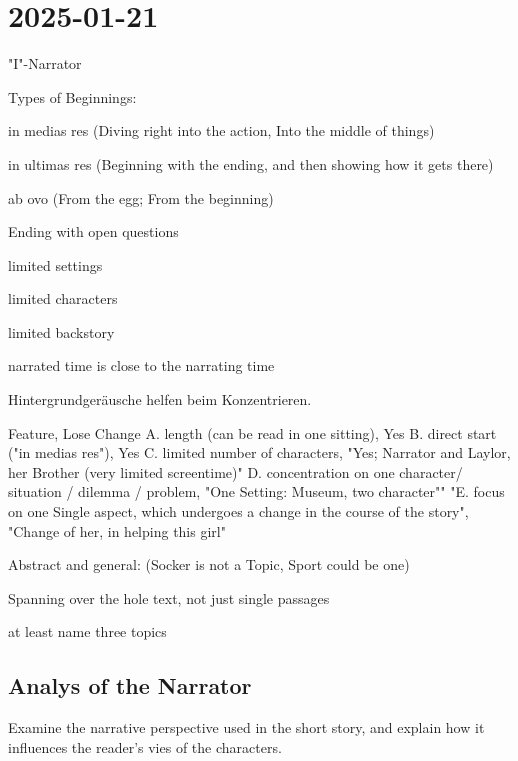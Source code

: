 \section{2025-01-21}

\startitemize[packed]
\item "I"-Narrator
\stopitemize

\startitemize[packed]
\item Types of Beginnings:
\startitemize[packed]
\item in medias res (Diving right into the action, Into the middle of things)
\item in ultimas res (Beginning with the ending, and then showing how it gets there)
\item ab ovo (From the egg; From the beginning)
\stopitemize
\item Ending with open questions
\item limited settings
\item limited characters
\item limited backstory
\item narrated time is close to the narrating time
\stopitemize

\startframedtipp
Hintergrundgeräusche helfen beim Konzentrieren.
\stopframedtipp

\startplacetable[location={here},title={analysis}]
\setupTABLE[r][1][background=color,backgroundcolor=gray]
\bTABLE[offset=1mm]
\startCSV
Feature, Lose Change
A. length (can be read in one sitting), Yes
B. direct start ("in medias res"), Yes
C. limited number of characters, "Yes; Narrator and Laylor, her Brother (very limited screentime)"
D. concentration on one character/ situation / dilemma / problem, "One Setting: Museum, two character""
"E. focus on one Single aspect, which undergoes a change in the course of the story", "Change of her, in helping this girl"
\stopCSV
\eTABLE
\stopplacetable

\startdefinition[title={Topic}]
\startitemize[packed]
\item Abstract and general: (Socker is not a Topic, Sport could be one)
\item Spanning over the hole text, not just single passages
\item at least name three topics 
\stopitemize
\stopdefinition

\subsection{Analys of the Narrator}

\startframedtask
Examine the narrative perspective used in the short story, and explain how it influences the reader's vies of the characters.
\stopframedtask

